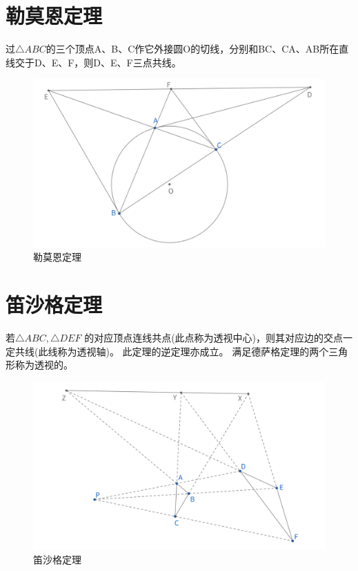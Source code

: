\newpage
\section{勒莫恩定理}
\begin{theorem}
过$\triangle ABC$的三个顶点A、B、C作它外接圆O的切线，分别和BC、CA、AB所在直线交于D、E、F，则D、E、F三点共线。
\end{theorem}
\begin{figure}[H]
    \centering
    \includegraphics[width=\linewidth]{figures/勒莫恩定理.png}
    \caption{勒莫恩定理}
\end{figure}


\newpage
\section{笛沙格定理}
\begin{theorem}
若$\triangle ABC, \triangle DEF$ 的对应顶点连线共点(此点称为透视中心)，则其对应边的交点一定共线(此线称为透视轴)。
此定理的逆定理亦成立。
满足德萨格定理的两个三角形称为透视的。
\end{theorem}
\begin{figure}[H]
    \centering
    \includegraphics[width=\linewidth]{figures/笛沙格定理.png}
    \caption{笛沙格定理}
\end{figure}


